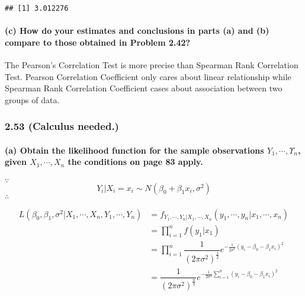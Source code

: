 \documentclass[]{article}
\let\oldparagraph\paragraph
\renewcommand{\paragraph}[1]{\oldparagraph{#1}\mbox{}}
\begin{document}
\begin{verbatim}
## [1] 3.012276
\end{verbatim}

\paragraph{(c) How do your estimates and conclusions in parts (a) and
(b) compare to those obtained in Problem
2.42?}\label{c-how-do-your-estimates-and-conclusions-in-parts-a-and-b-compare-to-those-obtained-in-problem-2.42}

The Pearson's Correlation Test is more precise than Spearman Rank
Correlation Test. Pearson Correlation Coefficient only cares about
linear relationship while Spearman Rank Correlation Coefficient cases
about association between two groups of data.

\subsubsection{2.53 (Calculus needed.)}\label{calculus-needed.}

\paragraph{\texorpdfstring{(a) Obtain the likelihood function for the
sample observations \(Y_1,\cdots, Υ_n\), given \(X_1 , \cdots, X_n\) the
conditions on page 83
apply.}{(a) Obtain the likelihood function for the sample observations Y\_1,\textbackslash{}cdots, Υ\_n, given X\_1 , \textbackslash{}cdots, X\_n the conditions on page 83 apply.}}\label{a-obtain-the-likelihood-function-for-the-sample-observations-y_1cdots-_n-given-x_1-cdots-x_n-the-conditions-on-page-83-apply.}

\(\because\quad\) \[Y_i|X_i=x_i\sim N(\beta_0+\beta_1x_i,\sigma^2)\]
\(\therefore\quad\)

\begin{align*}
L(\beta_0,\beta_1,\sigma^2|X_1,\cdots,X_n,Y_1,\cdots,Y_n)&=f_{Y_1,\cdots,Y_n|X_1,\cdots,X_n}(y_1,\cdots,y_n|x_1,\cdots,x_n)\\
&=\prod\limits_{i=1}^nf(y_1|x_1)\\
&=\prod\limits_{i=1}^n\dfrac{1}{(2\pi\sigma^2)^{\frac{1}{2}}}e^{-\frac{1}{2\sigma^2}(y_i-\beta_0-\beta_1x_i)^2}\\
&=\dfrac{1}{(2\pi\sigma^2)^{\frac{n}{2}}}e^{-\frac{1}{2\sigma^2}\sum\limits_{i=1}^n(y_i-\beta_0-\beta_1x_i)^2}
\end{align*}
\end{document}
